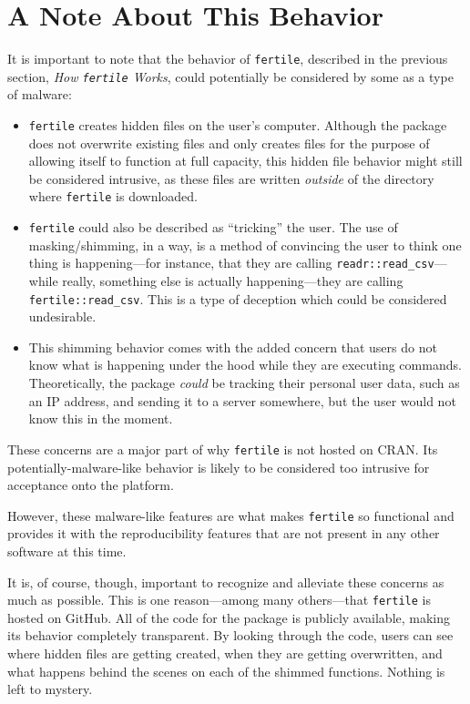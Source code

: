 \documentclass[12pt,twoside]{reedthesis}
\begin{document}
\hypertarget{a-note-about-this-behavior}{%
\section{A Note About This Behavior}\label{a-note-about-this-behavior}}

It is important to note that the behavior of \texttt{fertile}, described in the previous section, \emph{How \texttt{fertile} Works}, could potentially be considered by some as a type of malware:
\begin{itemize}
\item
  \texttt{fertile} creates hidden files on the user's computer. Although the package does not overwrite existing files and only creates files for the purpose of allowing itself to function at full capacity, this hidden file behavior might still be considered intrusive, as these files are written \emph{outside} of the directory where \texttt{fertile} is downloaded.
\item
  \texttt{fertile} could also be described as ``tricking'' the user. The use of masking/shimming, in a way, is a method of convincing the user to think one thing is happening---for instance, that they are calling \texttt{readr::read\_csv}---while really, something else is actually happening---they are calling \texttt{fertile::read\_csv}. This is a type of deception which could be considered undesirable.
\item
  This shimming behavior comes with the added concern that users do not know what is happening under the hood while they are executing commands. Theoretically, the package \emph{could} be tracking their personal user data, such as an IP address, and sending it to a server somewhere, but the user would not know this in the moment.
\end{itemize}
These concerns are a major part of why \texttt{fertile} is not hosted on CRAN. Its potentially-malware-like behavior is likely to be considered too intrusive for acceptance onto the platform.

However, these malware-like features are what makes \texttt{fertile} so functional and provides it with the reproducibility features that are not present in any other software at this time.

It is, of course, though, important to recognize and alleviate these concerns as much as possible. This is one reason---among many others---that \texttt{fertile} is hosted on GitHub. All of the code for the package is publicly available, making its behavior completely transparent. By looking through the code, users can see where hidden files are getting created, when they are getting overwritten, and what happens behind the scenes on each of the shimmed functions. Nothing is left to mystery.
\end{document}
